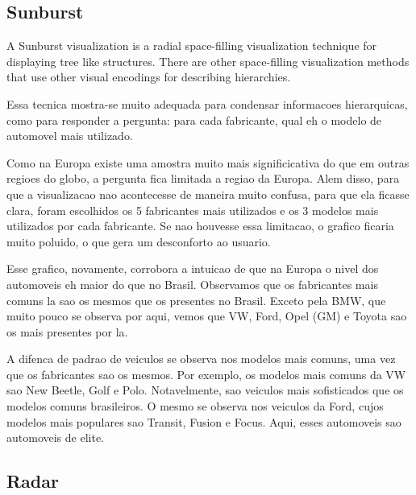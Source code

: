 \documentclass[10pt, conference]{IEEEtran}
\begin{document}
\subsection{Sunburst}

A Sunburst visualization is a radial space-filling visualization technique for displaying tree like structures. 
There are other space-filling visualization methods that use other visual encodings for describing hierarchies.

Essa tecnica mostra-se muito adequada para condensar informacoes hierarquicas, como para responder a pergunta:
para cada fabricante, qual eh o modelo de automovel mais utilizado. 

Como na Europa existe uma amostra muito mais significicativa do que em outras regioes do globo, a
pergunta fica limitada a regiao da Europa. Alem disso, para que a visualizacao nao acontecesse de maneira
muito confusa, para que ela ficasse clara, foram escolhidos os 5 fabricantes mais utilizados e os 3 modelos
mais utilizados por cada fabricante. Se nao houvesse essa limitacao, o grafico ficaria muito poluido, o que
gera um desconforto ao usuario.

Esse grafico, novamente, corrobora a intuicao de que na Europa o nivel dos automoveis eh maior do que no Brasil.
Observamos que os fabricantes mais comuns la sao os mesmos que os presentes no Brasil. Exceto pela BMW, que
muito pouco se observa por aqui, vemos que VW, Ford, Opel (GM) e Toyota sao os mais presentes por la.

A difenca de padrao de veiculos se observa nos modelos mais comuns, uma vez que os fabricantes sao os mesmos.
Por exemplo, os modelos mais comuns da VW sao New Beetle, Golf e Polo. Notavelmente, sao veiculos mais
sofisticados que os modelos comuns brasileiros. O mesmo se observa nos veiculos da Ford, cujos modelos
mais populares sao Transit, Fusion e Focus. Aqui, esses automoveis sao automoveis de elite.





\subsection{Radar}
\end{document}
